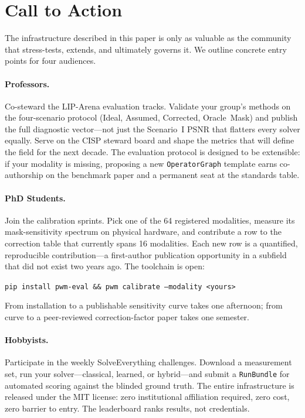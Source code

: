
\section{Call to Action}
\label{sec:action}

The infrastructure described in this paper is only as valuable as the
community that stress-tests, extends, and ultimately governs it.  We
outline concrete entry points for four audiences.

\paragraph{Professors.}
Co-steward the LIP-Arena evaluation tracks.  Validate your group's
methods on the four-scenario protocol (Ideal, Assumed, Corrected,
Oracle~Mask) and publish the full diagnostic vector---not just the
Scenario~I PSNR that flatters every solver equally.  Serve on the CISP
steward board and shape the metrics that will define the field for the
next decade.  The evaluation protocol is designed to be extensible: if
your modality is missing, proposing a new \texttt{OperatorGraph} template
earns co-authorship on the benchmark paper and a permanent seat at the
standards table.

\paragraph{PhD Students.}
Join the calibration sprints.  Pick one of the 64 registered modalities,
measure its mask-sensitivity spectrum on physical hardware, and
contribute a row to the correction table that currently spans 16
modalities.  Each new row is a quantified, reproducible contribution---a
first-author publication opportunity in a subfield that did not exist two
years ago.  The toolchain is open:

\begin{center}
\texttt{pip install pwm-eval \&\& pwm calibrate --modality <yours>}
\end{center}

\noindent
From installation to a publishable sensitivity curve takes one
afternoon; from curve to a peer-reviewed correction-factor paper takes
one semester.

\paragraph{Hobbyists.}
Participate in the weekly SolveEverything challenges.  Download a
measurement set, run your solver---classical, learned, or hybrid---and
submit a \texttt{RunBundle} for automated scoring against the blinded
ground truth.  The entire infrastructure is released under the MIT
license: zero institutional affiliation required, zero cost, zero
barrier to entry.  The leaderboard ranks results, not credentials.

